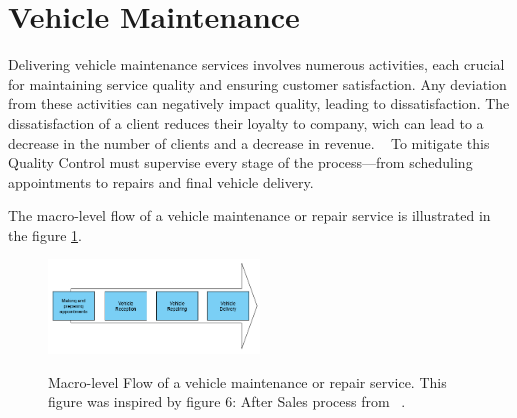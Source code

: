 

\section{Vehicle Maintenance}

Delivering vehicle maintenance services involves numerous activities, each crucial for maintaining service quality and ensuring customer satisfaction. 
Any deviation from these activities can negatively impact quality, leading to dissatisfaction. 
The dissatisfaction of a client reduces their loyalty to company, wich can lead to a decrease in the number of clients and a decrease in revenue. ~\cite{Setting_the_after_sale_process}
To mitigate this Quality Control must supervise every stage of the process—from scheduling appointments to repairs and final vehicle delivery. ~\cite{Setting_the_after_sale_process}

The macro-level flow of a vehicle maintenance or repair service is illustrated in the figure \ref{fig:Vehicle_maintenace_macro}. 




\begin{figure}[h]
  \caption{Macro-level Flow of a vehicle maintenance or repair service. This figure was inspired by figure 6: After Sales process from ~\citet{Setting_the_after_sale_process}.}
  \centering
  \includegraphics[width=0.50\textwidth]{figs/Vehicle_maintenace_macro}
  \label{fig:Vehicle_maintenace_macro}
\end{figure}


